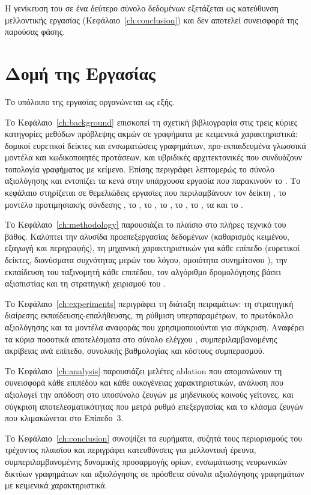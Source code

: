 Η γενίκευση του  σε ένα δεύτερο σύνολο δεδομένων  εξετάζεται
ως κατεύθυνση μελλοντικής εργασίας (Κεφάλαιο~\ref{ch:conclusion}) και δεν
αποτελεί συνεισφορά της παρούσας φάσης.


\section{Δομή της Εργασίας}
\label{sec:structure}

Το υπόλοιπο της εργασίας οργανώνεται ως εξής.

Το Κεφάλαιο~\ref{ch:background} επισκοπεί τη σχετική βιβλιογραφία στις τρεις κύριες
κατηγορίες μεθόδων πρόβλεψης ακμών σε γραφήματα με κειμενικά χαρακτηριστικά: δομικοί
ευρετικοί δείκτες και ενσωματώσεις γραφημάτων, προ-εκπαιδευμένα γλωσσικά μοντέλα και
κωδικοποιητές προτάσεων, και υβριδικές αρχιτεκτονικές που συνδυάζουν τοπολογία γραφήματος
με κείμενο.
Επίσης περιγράφει λεπτομερώς το σύνολο αξιολόγησης  και εντοπίζει τα κενά στην υπάρχουσα εργασία που παρακινούν το .
Το κεφάλαιο στηρίζεται σε θεμελιώδεις εργασίες που περιλαμβάνουν τον δείκτη
 \cite{adamic2003friends}, το μοντέλο προτιμησιακής σύνδεσης
 \cite{barabasi1999emergence}, το 
\cite{grover2016node2vec}, το  \cite{devlin2019bert}, το 
\cite{liu2019roberta}, το  \cite{reimers2019sentence}, το
 \cite{yasunaga2022linkbert}, τα 
\cite{yang2021graphformers} και το  \cite{jin2023patton}.

Το Κεφάλαιο~\ref{ch:methodology} παρουσιάζει το πλαίσιο  στο πλήρες
τεχνικό του βάθος.
Καλύπτει την αλυσίδα προεπεξεργασίας δεδομένων (καθαρισμός
κειμένου, εξαγωγή  και περιγραφής), τη μηχανική χαρακτηριστικών για
κάθε επίπεδο (ευρετικοί δείκτες, διανύσματα συχνότητας μερών του λόγου,
ομοιότητα συνημίτονου ), την εκπαίδευση του ταξινομητή κάθε
επιπέδου, τον αλγόριθμο δρομολόγησης βάσει αξιοπιστίας και τη στρατηγική χειρισμού
του .

Το Κεφάλαιο~\ref{ch:experiments} περιγράφει τη διάταξη πειραμάτων: τη στρατηγική διαίρεσης
εκπαίδευσης-επαλήθευσης, τη ρύθμιση υπερπαραμέτρων, το πρωτόκολλο αξιολόγησης και
τα μοντέλα αναφοράς που χρησιμοποιούνται για σύγκριση.
Αναφέρει τα κύρια ποσοτικά
αποτελέσματα στο σύνολο ελέγχου , συμπεριλαμβανομένης ακρίβειας ανά
επίπεδο, συνολικής βαθμολογίας  και κόστους συμπερασμού.

Το Κεφάλαιο~\ref{ch:analysis} παρουσιάζει μελέτες ablation που απομονώνουν τη συνεισφορά κάθε
επιπέδου και κάθε οικογένειας χαρακτηριστικών, ανάλυση  που
αξιολογεί την απόδοση στο υποσύνολο ζευγών με μηδενικούς κοινούς γείτονες, και
σύγκριση αποτελεσματικότητας που μετρά ρυθμό επεξεργασίας και το κλάσμα ζευγών που
κλιμακώνεται στο Επίπεδο~3.

Το Κεφάλαιο~\ref{ch:conclusion} συνοψίζει τα ευρήματα, συζητά τους περιορισμούς του τρέχοντος
πλαισίου και περιγράφει κατευθύνσεις για μελλοντική έρευνα, συμπεριλαμβανομένης
δυναμικής προσαρμογής ορίων, ενσωμάτωσης νευρωνικών δικτύων γραφημάτων και αξιολόγησης
σε πρόσθετα σύνολα αξιολόγησης γραφημάτων με κειμενικά χαρακτηριστικά.
